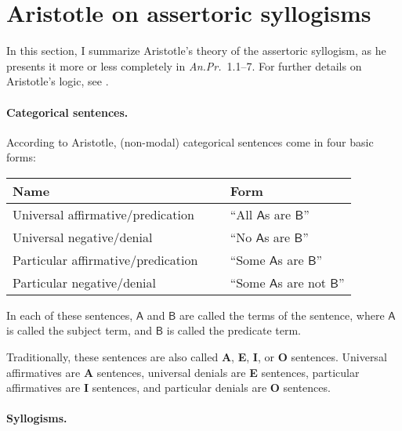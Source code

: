 \documentclass{article}
\newcommand\e{\mathsf}
\def\AnPr/{\emph{An.Pr.}}
\def\ASent/{\textbf{A}}
\def\ESent/{\textbf{E}}
\def\ISent/{\textbf{I}}
\def\OSent/{\textbf{O}}
\def\A/{\e{A}}
\def\B/{\e{B}}
\begin{document}
\section{Aristotle on assertoric syllogisms}
\label{sec:aristotle-on-assertoric-syllogisms}

In this section, I summarize Aristotle's theory of the assertoric syllogism, as he presents it more or less completely in \AnPr/~1.1--7. For further details on Aristotle's logic, see \citet{Smith1995}.


\paragraph{Categorical sentences.} 

According to Aristotle, (non-modal) categorical sentences come in four basic forms:

\begin{center}
\begin{tabular}{l p{0.25cm} l}
  \textbf{Name} & ~ & \textbf{Form} \\
  \hline
  Universal affirmative/predication & ~ & ``All $\A/$s are $\B/$'' \\
  Universal negative/denial & ~ & ``No $\A/$s are $\B/$'' \\
  Particular affirmative/predication & ~ &  ``Some $\A/$s are $\B/$'' \\
  Particular negative/denial & ~ &  ``Some $\A/$s are not $\B/$''
\end{tabular}
\end{center}

In each of these sentences, $\A/$ and $\B/$ are called the terms of the sentence, where $\A/$ is called the subject term, and $\B/$ is called the predicate term.

Traditionally, these sentences are also called \ASent/, \ESent/, \ISent/, or \OSent/ sentences. Universal affirmatives are \ASent/ sentences, universal denials are \ESent/ sentences, particular affirmatives are \ISent/ sentences, and particular denials are \OSent/ sentences. 


\paragraph{Syllogisms.}
\end{document}
